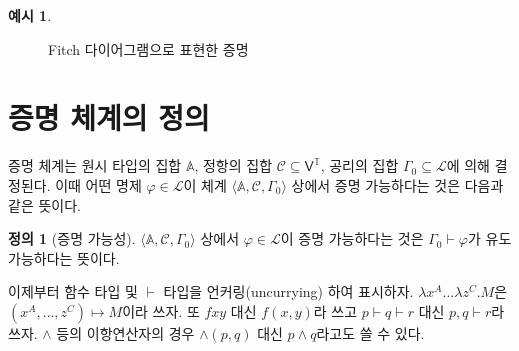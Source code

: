 \documentclass[10pt,twocolumn]{article}
\theoremstyle{definition}
\newtheorem{definition}[theorem]{정의}
\newtheorem{example}[theorem]{예시}
\begin{document}
\begin{example}
	\begin{figure}[bt] \centering\small{}
		\caption{Fitch 다이어그램으로 표현한 증명} \label{fig:proof2}
	\end{figure}
\end{example}

\section{증명 체계의 정의}

증명 체계는 원시 타입의 집합 $\mathbb A$, 정항의 집합 $\mathcal C\subseteq\mathsf V^{\mathds T}$, 공리의 집합 $\Gamma_0\subseteq\mathcal L$에 의해 결정된다. 이때 어떤 명제 $\varphi\in\mathcal L$이 체계 $\langle\mathbb A,\mathcal C,\Gamma_0\rangle$ 상에서 증명 가능하다는 것은 다음과 같은 뜻이다.

\begin{definition}[증명 가능성]
	$\langle\mathbb A,\mathcal C,\Gamma_0\rangle$ 상에서 $\varphi\in\mathcal L$이 증명 가능하다는 것은 $\Gamma_0\vdash\varphi$가 유도 가능하다는 뜻이다.
\end{definition}

이제부터 함수 타입 및 $\vdash$ 타입을 언커링(uncurrying) 하여 표시하자. $\lambda x^A\ldots\lambda z^C.M$은 $(x^A, \ldots, z^C)\mapsto M$이라 쓰자. 또 $fxy$ 대신 $f(x, y)$라 쓰고 $p\vdash q\vdash r$ 대신 $p, q\vdash r$라 쓰자. $\land$ 등의 이항연산자의 경우 ${\land}(p, q)$ 대신 $p\land q$라고도 쓸 수 있다.
\end{document}
